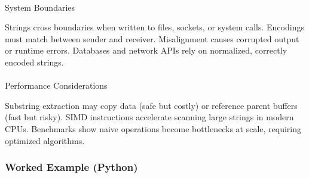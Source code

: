 \documentclass[
  letterpaper,
  DIV=11,
  numbers=noendperiod]{scrreprt}
\makeatletter
\let\oldparagraph\paragraph
\renewcommand{\paragraph}{
    \@ifstar
      \xxxParagraphStar
      \xxxParagraphNoStar
  }
\newcommand{\xxxParagraphStar}[1]{\oldparagraph*{#1}\mbox{}}
\newcommand{\xxxParagraphNoStar}[1]{\oldparagraph{#1}\mbox{}}
\makeatother
\begin{document}
\paragraph{System Boundaries}\label{system-boundaries}

Strings cross boundaries when written to files, sockets, or system
calls. Encodings must match between sender and receiver. Misalignment
causes corrupted output or runtime errors. Databases and network APIs
rely on normalized, correctly encoded strings.

\paragraph{Performance Considerations}\label{performance-considerations}

Substring extraction may copy data (safe but costly) or reference parent
buffers (fast but risky). SIMD instructions accelerate scanning large
strings in modern CPUs. Benchmarks show naive operations become
bottlenecks at scale, requiring optimized algorithms.

\subsubsection{Worked Example (Python)}\label{worked-example-python-9}
\end{document}
